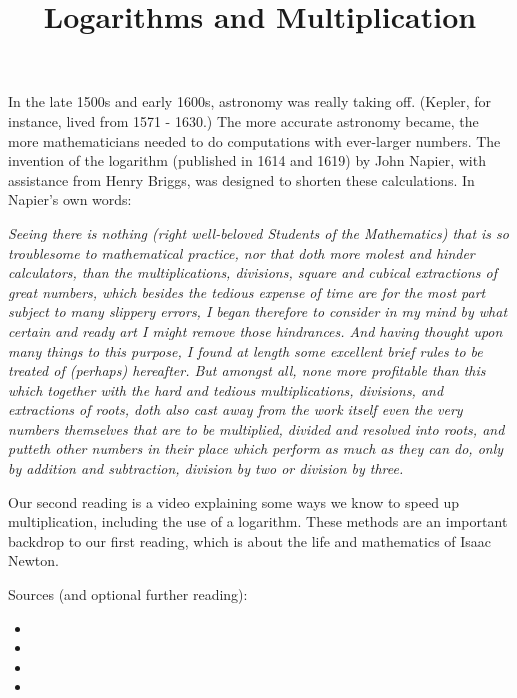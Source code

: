 \documentclass[nooutcomes]{ximera}
\title{Logarithms and Multiplication}
\begin{document}
\begin{abstract}
    
\end{abstract}
\maketitle

In the late 1500s and early 1600s, astronomy was really taking off.  (Kepler, for instance, lived from 1571 - 1630.)  The more accurate astronomy became, the more mathematicians needed to do computations with ever-larger numbers.  The invention of the logarithm (published in 1614 and 1619) by John Napier, with assistance from Henry Briggs, was designed to shorten these calculations.  In Napier's own words: 

{\em Seeing there is nothing (right well-beloved Students of the Mathematics) that is so troublesome to mathematical practice, nor that doth more molest and hinder calculators, than the multiplications, divisions, square and cubical extractions of great numbers, which besides the tedious expense of time are for the most part subject to many slippery errors, I began therefore to consider in my mind by what certain and ready art I might remove those hindrances. And having thought upon many things to this purpose, I found at length some excellent brief rules to be treated of (perhaps) hereafter. But amongst all, none more profitable than this which together with the hard and tedious multiplications, divisions, and extractions of roots, doth also cast away from the work itself even the very numbers themselves that are to be multiplied, divided and resolved into roots, and putteth other numbers in their place which perform as much as they can do, only by addition and subtraction, division by two or division by three.}

Our second reading is a video explaining some ways we know to speed up multiplication, including the use of a logarithm.  These methods are an important backdrop to our first reading, which is about the life and mathematics of Isaac Newton.

Sources (and optional further reading):
\begin{itemize}
\item {}
\item {}
\item {}
\item {}
\end{itemize}
\end{document}
